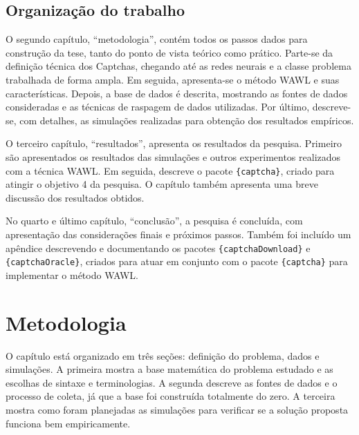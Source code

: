 \documentclass[12pt,twoside,brazilian]{book}
\begin{document}
\hypertarget{sec-organizacao}{%
\section{Organização do trabalho}\label{sec-organizacao}}

O segundo capítulo, ``metodologia'', contém todos os passos dados para
construção da tese, tanto do ponto de vista teórico como prático.
Parte-se da definição técnica dos Captchas, chegando até as redes
neurais e a classe problema trabalhada de forma ampla. Em seguida,
apresenta-se o método WAWL e suas características. Depois, a base de
dados é descrita, mostrando as fontes de dados consideradas e as
técnicas de raspagem de dados utilizadas. Por último, descreve-se, com
detalhes, as simulações realizadas para obtenção dos resultados
empíricos.

O terceiro capítulo, ``resultados'', apresenta os resultados da
pesquisa. Primeiro são apresentados os resultados das simulações e
outros experimentos realizados com a técnica WAWL. Em seguida, descreve
o pacote \texttt{\{captcha\}}, criado para atingir o objetivo 4 da
pesquisa. O capítulo também apresenta uma breve discussão dos resultados
obtidos.

No quarto e último capítulo, ``conclusão'', a pesquisa é concluída, com
apresentação das considerações finais e próximos passos. Também foi
incluído um apêndice descrevendo e documentando os pacotes
\texttt{\{captchaDownload\}} e \texttt{\{captchaOracle\}}, criados para
atuar em conjunto com o pacote \texttt{\{captcha\}} para implementar o
método WAWL.


\hypertarget{sec-metodologia}{%
\chapter{Metodologia}\label{sec-metodologia}}


O capítulo está organizado em três seções: definição do problema, dados
e simulações. A primeira mostra a base matemática do problema estudado e
as escolhas de sintaxe e terminologias. A segunda descreve as fontes de
dados e o processo de coleta, já que a base foi construída totalmente do
zero. A terceira mostra como foram planejadas as simulações para
verificar se a solução proposta funciona bem empiricamente.
\end{document}
